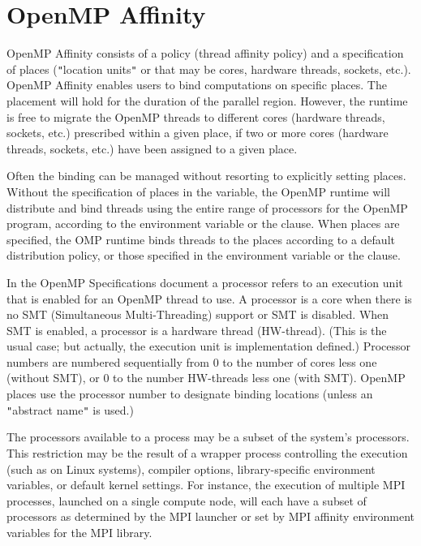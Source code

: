 \pagebreak
\chapter{OpenMP Affinity}
\label{chap:openmp_affinity}

OpenMP Affinity consists of a  policy (thread affinity policy) and a specification of
places (\texttt{"}location units\texttt{"} or  that may be cores, hardware
threads, sockets, etc.).  
OpenMP Affinity enables users to bind computations on specific places.
The placement will hold for the duration of the parallel region. 
However, the runtime is free to migrate the OpenMP threads 
to different cores (hardware threads, sockets, etc.) prescribed within a given place, 
if two or more cores (hardware threads, sockets, etc.) have been assigned to a given place.

Often the binding can be managed without resorting to explicitly setting places.
Without the specification of places in the  variable, 
the OpenMP runtime will distribute and bind threads using the entire range of processors for 
the OpenMP program, according to the  environment variable
or the  clause.  When places are specified, the OMP runtime
binds threads to the places according to a default distribution policy, or
those specified in the  environment variable or the
 clause.

In the OpenMP Specifications document a processor refers to an execution unit that
is enabled for an OpenMP thread to use.  A processor is a core when there is
no SMT (Simultaneous Multi-Threading) support or SMT is disabled.  When 
SMT is enabled, a processor is a hardware thread (HW-thread). (This is the
usual case; but actually, the execution unit is implementation defined.) Processor
numbers are numbered sequentially from 0 to the number of cores less one (without SMT), or
0 to the number HW-threads less one (with SMT). OpenMP places use the processor number to designate
binding locations (unless an \texttt{"}abstract name\texttt{"} is used.) 


The processors available to a process may be a subset of the system's
processors.  This restriction may be the result of a 
wrapper process controlling the execution (such as  on Linux systems), 
compiler options, library-specific environment variables, or default
kernel settings.  For instance, the execution of multiple MPI processes,
launched on a single compute node, will each have a subset of processors as
determined by the MPI launcher or set by MPI affinity environment 
variables for the MPI library.  %

